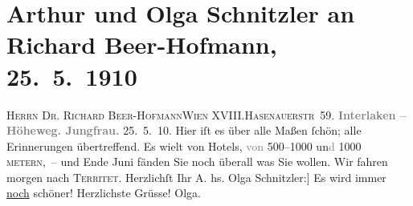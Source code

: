 

         
         \renewcommand{\erwaehntePersonen}{Personen: Richard Beer-Hofmann, Olga Schnitzler}
         \renewcommand{\erwaehnteOrte}{Orte: Hasenauerstraße, Höheweg, Interlaken, Jungfrau, Territet, Wien, XVIII., Währing}
         \renewcommand{\erwaehnteWerke}{}
               \section[Arthur und Olga Schnitzler an Richard Beer-Hofmann, 25. 5. 1910]{ Arthur und Olga Schnitzler an Richard Beer-Hofmann, 25. 5. 1910}\nopagebreak{}\rehead{ }\begin{ledgroupsized}[t]{13cm}\normalsize\beginnumbering \toendnotes[C]{\smallbreak\pagebreak[2]} 
\pstart{}{\pb}\textsc{Herrn Dr. Richard Beer-Hofmann}\pend{}\pstart{}\textsc{Wien XVIII.}\pend{}\pstart{}\textsc{Hasenauerstr 59}.\pend{}{\bigskip}\pstart
           \noindent{}\centering{}{\pb}\textcolor{gray}{\textbf{Interlaken – Höheweg. Jungfrau.}}\pend
           \pstart
           \raggedleft{}25. 5. 10.\pend
           \pstart
           {\pb}Hier iſt es über alle Maßen ſchön; alle Erinnerungen
               übertreffend. Es wi{\geminationm}elt von Hotels,
                  \textcolor{gray}{von} 500–1000 un\textcolor{gray}{d} 1000 \textsc{metern}, – und Ende Juni fänden Sie \introOben{}noch\introOben{} überall was Sie wollen. Wir fahren morgen nach \textsc{Territet}.\pend
           \pstart Herzlichſt Ihr \spacefill\mbox{A.}\pend{}\pstart
           \noindent{}{[}hs. Olga Schnitzler:{]} Es wird immer \uline{noch}
               schöner!\pend
           \pstart Herzlichste Grüsse! \spacefill\mbox{Olga.}\pend{}
         
         \endnumbering{}\end{ledgroupsized}  \newcommand{\dateiname}{L01934}\newcommand{\titel}{Arthur und Olga Schnitzler an Richard Beer-Hofmann, 25. 5. 1910}\newcommand{\editorInnen}{Martin Anton Müller und Gerd-Hermann Susen}
      
